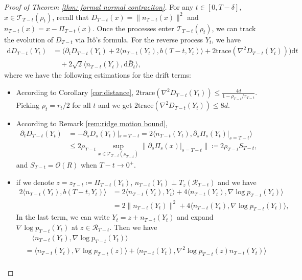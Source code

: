 \documentclass[10pt,a4paper]{amsart}
\newcommand{\Tr}{\mathrm{trace}}
\newcommand{\dee}{\mathrm{d}}
\newcommand{\mc}{\mathcal}
\begin{document}
\begin{proof}[Proof of Theorem \ref{thm: formal normal contraciton}]
For any $t\in [0,T-\delta]$, $x\in \mc{T}_{T-t}(\rho_t)$, recall that $D_{T-t}(x)=\| n_{T-t}(x) \|^2$ and $n_{T-t}(x)=x-\Pi_{T-t}(x)$. Once the processes enter $\mc{T}_{T-t}(\rho_t)$, we can track the evolution of $D_{T-t}$ via It\^o's formula. For the reverse process $Y_t$, we have
\begin{align*}
    \dee D_{T-t}(Y_t) &= \big( \partial_t D_{T-t}(Y_t) + 2\langle n_{T-t}(Y_t), b(T-t,Y_t) \rangle + 2\Tr(\nabla^2 D_{T-t}(Y_t))\big)\dee t \\
    &\quad + 2\sqrt{2}\langle n_{T-t}(Y_t),\dee \bar{B}_t \rangle,
\end{align*}
where we have the following estimations for the drift terms:
\begin{itemize}
    \item [(1)] According to Corollary \ref{cor:distance}, $2\Tr(\nabla^2 D_{T-t}(Y_t))\le \tfrac{4d}{1-\rho_{T-t}/r_{T-t}}$. Picking $\rho_t=r_t/2$ for all $t$ and we get $2\Tr(\nabla^2 D_{T-t}(Y_t))\le 8d$.
    \item [(2)] According to Remark \ref{rem:ridge motion bound}, 
    \begin{align*}
        \partial_t D_{T-t}(Y_t)&=-\partial_s D_s(Y_t)|_{s=T-t}= 2\langle n_{T-t}(Y_t), \partial_s \Pi_s (Y_t) |_{s=T-t}  \rangle \\
        &\le 2\rho_{T-t} \sup_{x\in \mc{T}_{T-t}(\rho_{T-t})}\| \partial_s\Pi_s(x)|_{s=T-t} \|  \coloneqq 2\rho_{T-t} S_{T-t} ,
    \end{align*}
    and $S_{T-t}= \mc{O}(R)$ when $T-t\to 0^+$.
    \item [(3)] if we denote $z=z_{T-t}\coloneqq \Pi_{T-t}(Y_t)$, $n_{T-t}(Y_t)\perp T_z(\mc{R}_{T-t})$ and we have
    \begin{align*}
         2\langle n_{T-t}(Y_t) , b(T-t,Y_t) \rangle  & = 2\langle  n_{T-t}(Y_t) ,  Y_t \rangle + 4 \langle  n_{T-t}(Y_t) , \nabla\log p_{T-t}(Y_t) \rangle \\
        & = 2\| n_{T-t}(Y_t) \|^2 + 4 \langle  n_{T-t}(Y_t) , \nabla\log p_{T-t}(Y_t) \rangle,
    \end{align*}
    In the last term, we can write $Y_t=z+n_{T-t}(Y_t)$ and expand $\nabla\log p_{T-t}(Y_t)$ at $z\in \mc{R}_{T-t}$. Then we have
    \begin{align*}
        &\quad \langle  n_{T-t}(Y_t) , \nabla\log p_{T-t}(Y_t) \rangle \\
        & = \langle  n_{T-t}(Y_t) ,  \nabla\log p_{T-t}(z) \rangle + \langle  n_{T-t}(Y_t) ,  \nabla^2\log p_{T-t}(z) n_{T-t}(Y_t) \rangle \\

\end{align*}
\end{itemize}
\end{proof}
\end{document}
